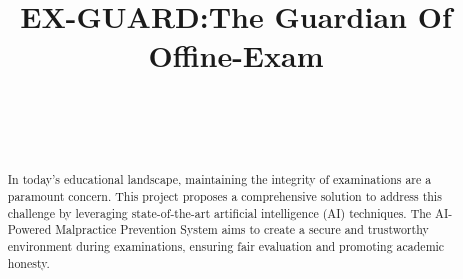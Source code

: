 \documentclass[conference]{IEEEtran}
\begin{document}
\title{EX-GUARD:The Guardian Of Offine-Exam\\
}

\author{ 
\\

\and
{}

\\




\and




}

\maketitle

\begin{abstract}
 In today's educational landscape, maintaining the integrity of
examinations are a paramount concern. This project proposes
a comprehensive solution to address this challenge by
leveraging state-of-the-art artificial intelligence (AI)
techniques. The AI-Powered Malpractice Prevention System
aims to create a secure and trustworthy environment during
examinations, ensuring fair evaluation and promoting
academic honesty.
\end{abstract}
\end{document}
